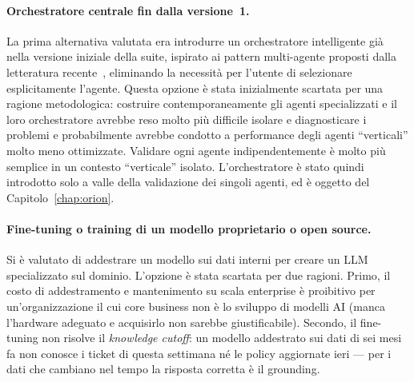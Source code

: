 \paragraph{Orchestratore centrale fin dalla versione~1.}
La prima alternativa valutata era introdurre un orchestratore
intelligente già nella versione iniziale della suite, ispirato
ai pattern multi-agente proposti dalla letteratura recente~\cite{wu2023autogen,guo2024multiagent,wang2024moa}, eliminando la
necessità per l'utente di selezionare esplicitamente l'agente. Questa
opzione è stata inizialmente scartata per una ragione metodologica: costruire
contemporaneamente gli agenti specializzati e il loro orchestratore
avrebbe reso molto più difficile isolare e diagnosticare i problemi e probabilmente avrebbe
condotto a performance degli agenti ``verticali'' molto meno ottimizzate.
Validare ogni agente indipendentemente è molto più semplice in un contesto ``verticale'' isolato.
L'orchestratore è stato quindi introdotto solo a valle della validazione
dei singoli agenti, ed è oggetto del Capitolo~\ref{chap:orion}.

\paragraph{Fine-tuning o training di un modello proprietario o open source.}
Si è valutato di addestrare un modello sui dati interni per creare un LLM specializzato sul dominio.
L'opzione è stata scartata per due ragioni. Primo, il costo di addestramento e mantenimento su scala
enterprise è proibitivo per un'organizzazione il cui core business non è lo sviluppo di modelli AI
(manca l'hardware adeguato e acquisirlo non sarebbe giustificabile). Secondo, il fine-tuning non
risolve il \emph{knowledge cutoff}: un modello addestrato sui dati di sei mesi fa non conosce i ticket
di questa settimana né le policy aggiornate ieri --- per i dati che cambiano nel tempo la risposta
corretta è il grounding.
